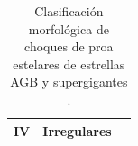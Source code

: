\begin{table}
\begin{tabular}{llc}
    IV & Irregulares & \\
    \bottomrule
  \end{tabular}
  \caption{Clasificación morfológica de choques de proa estelares de estrellas AGB y supergigantes \citep{Cox:2012}.}
  \label{tab:morphology-AGB}
\end{table}


